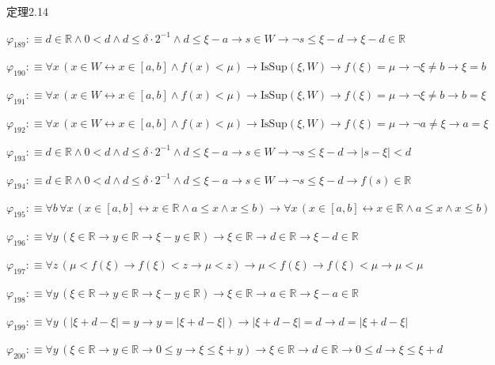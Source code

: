 \begin{fullproof}{定理2.14}
\begin{abbrevlist}
\item $\varphi_{189} :\equiv d \in \mathbb{R} \land 0 < d \land d \leq \delta \cdot 2^{-1} \land d \leq \xi - a \to s \in W \to \neg s \leq \xi - d \to \xi - d \in \mathbb{R}$
\item $\varphi_{190} :\equiv \forall x\,(x \in W \leftrightarrow x \in [a,b] \land f(x) < \mu) \to \mathrm{IsSup}(\xi,W) \to f(\xi) = \mu \to \neg \xi \neq b \to \xi = b$
\item $\varphi_{191} :\equiv \forall x\,(x \in W \leftrightarrow x \in [a,b] \land f(x) < \mu) \to \mathrm{IsSup}(\xi,W) \to f(\xi) = \mu \to \neg \xi \neq b \to b = \xi$
\item $\varphi_{192} :\equiv \forall x\,(x \in W \leftrightarrow x \in [a,b] \land f(x) < \mu) \to \mathrm{IsSup}(\xi,W) \to f(\xi) = \mu \to \neg a \neq \xi \to a = \xi$
\item $\varphi_{193} :\equiv d \in \mathbb{R} \land 0 < d \land d \leq \delta \cdot 2^{-1} \land d \leq \xi - a \to s \in W \to \neg s \leq \xi - d \to \lvert s - \xi \rvert < d$
\item $\varphi_{194} :\equiv d \in \mathbb{R} \land 0 < d \land d \leq \delta \cdot 2^{-1} \land d \leq \xi - a \to s \in W \to \neg s \leq \xi - d \to f(s) \in \mathbb{R}$
\item $\varphi_{195} :\equiv \forall b\,\forall x\,(x \in [a,b] \leftrightarrow x \in \mathbb{R} \land a \leq x \land x \leq b) \to \forall x\,(x \in [a,b] \leftrightarrow x \in \mathbb{R} \land a \leq x \land x \leq b)$
\item $\varphi_{196} :\equiv \forall y\,(\xi \in \mathbb{R} \to y \in \mathbb{R} \to \xi - y \in \mathbb{R}) \to \xi \in \mathbb{R} \to d \in \mathbb{R} \to \xi - d \in \mathbb{R}$
\item $\varphi_{197} :\equiv \forall z\,(\mu < f(\xi) \to f(\xi) < z \to \mu < z) \to \mu < f(\xi) \to f(\xi) < \mu \to \mu < \mu$
\item $\varphi_{198} :\equiv \forall y\,(\xi \in \mathbb{R} \to y \in \mathbb{R} \to \xi - y \in \mathbb{R}) \to \xi \in \mathbb{R} \to a \in \mathbb{R} \to \xi - a \in \mathbb{R}$
\item $\varphi_{199} :\equiv \forall y\,(\lvert \xi + d - \xi \rvert = y \to y = \lvert \xi + d - \xi \rvert) \to \lvert \xi + d - \xi \rvert = d \to d = \lvert \xi + d - \xi \rvert$
\item $\varphi_{200} :\equiv \forall y\,(\xi \in \mathbb{R} \to y \in \mathbb{R} \to 0 \leq y \to \xi \leq \xi + y) \to \xi \in \mathbb{R} \to d \in \mathbb{R} \to 0 \leq d \to \xi \leq \xi + d$

\end{abbrevlist}
\end{fullproof}
